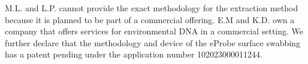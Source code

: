 \normalsize
%
M.L. and L.P. cannot provide the exact methodology for the extraction method because it is planned to be part of a commercial offering. E.M and K.D. own a company that offers services for environmental DNA in a commercial setting. We further declare that the methodology and device of the eProbe surface swabbing has a patent pending under the application number 102023000011244.
%
%
% 
%
%
%
